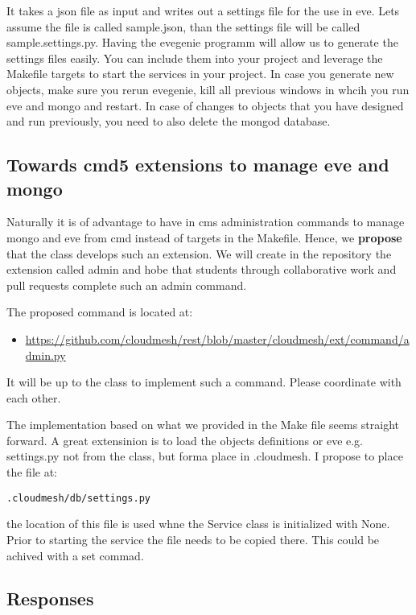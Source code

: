 It takes a json file as input and writes out a settings file for the use
in eve. Lets assume the file is called sample.json, than the settings
file will be called sample.settings.py. Having the evegenie programm
will allow us to generate the settings files easily. You can include
them into your project and leverage the Makefile targets to start the
services in your project. In case you generate new objects, make sure
you rerun evegenie, kill all previous windows in whcih you run eve and
mongo and restart. In case of changes to objects that you have designed
and run previously, you need to also delete the mongod database.

\subsection{Towards cmd5 extensions to manage eve and
mongo}\label{towards-cmd5-extensions-to-manage-eve-and-mongo}

Naturally it is of advantage to have in cms administration commands to
manage mongo and eve from cmd instead of targets in the Makefile. Hence,
we \textbf{propose} that the class develops such an extension. We will
create in the repository the extension called admin and hobe that
students through collaborative work and pull requests complete such an
admin command.

The proposed command is located at:

\begin{itemize}
\tightlist
\item
 \url{https://github.com/cloudmesh/rest/blob/master/cloudmesh/ext/command/admin.py}
\end{itemize}

It will be up to the class to implement such a command. Please
coordinate with each other.

The implementation based on what we provided in the Make file seems
straight forward. A great extensinion is to load the objects definitions
or eve e.g. settings.py not from the class, but forma place in
.cloudmesh. I propose to place the file at:

\begin{verbatim}
.cloudmesh/db/settings.py
\end{verbatim}

the location of this file is used whne the Service class is initialized
with None. Prior to starting the service the file needs to be copied
there. This could be achived with a set commad.


\subsection{Responses}

